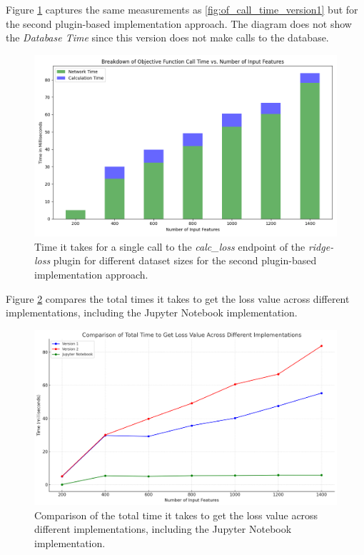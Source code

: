 \documentclass[
  a4paper,  %
  twoside,  %
  bibliography=totoc,
  headsepline,
  cleardoublepage=empty,
  parskip=half,
  draft=false
]{scrbook}
\begin{document}
Figure \ref{fig:of_call_time_version2} captures the same measurements as \ref{fig:of_call_time_version1} but for the second plugin-based implementation approach.
The diagram does not show the \emph{Database Time} since this version does not make calls to the database.

\begin{figure}
  \centering
  \includegraphics[width=\textwidth]{graphics/of_call_times_version2.png}
  \caption{Time it takes for a single call to the \emph{calc\_loss} endpoint of the \emph{ridge-loss} plugin for different dataset sizes for the second plugin-based implementation approach.}
  \label{fig:of_call_time_version2}
\end{figure}

Figure \ref{fig:coparison_of_of} compares the total times it takes to get the loss value across different implementations, including the Jupyter Notebook implementation.

\begin{figure}
  \centering
  \includegraphics[width=\textwidth]{graphics/comparison_of_of.png}
  \caption{Comparison of the total time it takes to get the loss value across different implementations, including the Jupyter Notebook implementation.}
  \label{fig:coparison_of_of}
\end{figure}
\end{document}
